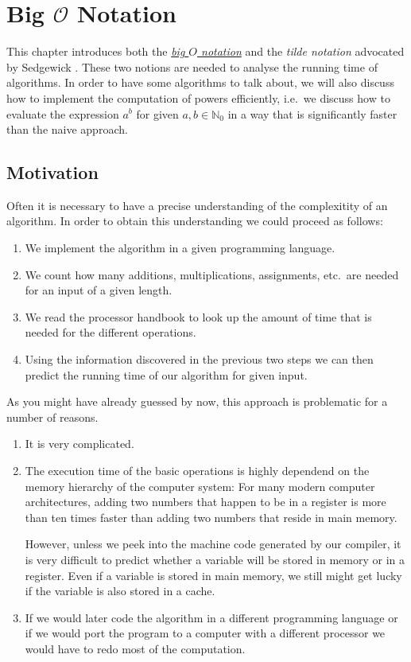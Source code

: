 \chapter{Big $\mathcal{O}$ Notation} 
This chapter introduces both the
\href{http://en.wikipedia.org/wiki/O_notation}{\emph{big $O$ notation}} and the
\emph{tilde notation} advocated by Sedgewick \cite{sedgewick:11}.
These two notions are needed to analyse the running time of algorithms.  In order to have some
algorithms to talk about, we will also discuss how to implement the computation of powers 
efficiently, i.e.~we discuss how to evaluate the expression $a^b$ for given
$a,b \in \mathbb{N}_0$ in a way that is significantly faster than the naive approach.



\section{Motivation}
Often it is necessary to have a precise understanding of the complexitity of an algorithm.  
In order to obtain this understanding we could proceed as follows:  
\begin{enumerate}
\item We implement the algorithm in a given programming language.
\item We count how many additions, multiplications, assignments, etc.~are needed
      for an input of a given length.
\item We read the processor handbook to look up the amount of time that is needed for the different operations.
\item Using the information discovered in the previous two steps we can then predict the running
      time of our algorithm for given input.
\end{enumerate}
As you might have already guessed by now, this approach is problematic for a number of reasons.
\begin{enumerate}
\item It is very complicated.
\item The execution time of the basic operations is highly dependend on the memory hierarchy of the
      computer system:  For many modern computer architectures, adding two numbers that happen to be
      in a register is more than ten times faster than adding two numbers that reside in main memory.

      However, unless we peek into the machine code generated by our compiler, it is very difficult
      to predict whether a variable will be stored in memory or in a register.  Even if a variable
      is stored in main memory, we still might get lucky if the variable is also stored in a cache.
\item If we would later code the algorithm in a different programming language or if we would port
      the program to a computer with a different processor we would have to redo most of the
      computation. 
\end{enumerate}
